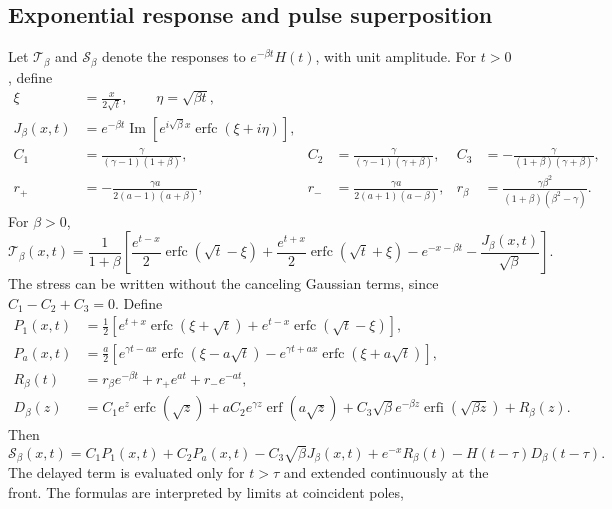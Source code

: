 \documentclass[11pt]{article}
\begin{document}
\subsection{Exponential response and pulse superposition}

Let $\mathcal T_\beta$ and $\mathcal S_\beta$ denote the responses to
$e^{-\beta t}H(t)$, with unit amplitude. For $t>0$, define
\begin{align}
 \xi&=\frac{x}{2\sqrt t},\qquad \eta=\sqrt{\beta t},\\
 J_\beta(x,t)&=e^{-\beta t}
  \operatorname{Im}\left[e^{i\sqrt\beta x}
     \operatorname{erfc}(\xi+i\eta)\right],\\
 C_1&=\frac{\gamma}{(\gamma-1)(1+\beta)},&
 C_2&=\frac{\gamma}{(\gamma-1)(\gamma+\beta)},&
 C_3&=-\frac{\gamma}{(1+\beta)(\gamma+\beta)},\\
 r_+&=-\frac{\gamma a}{2(a-1)(a+\beta)},&
 r_-&=\frac{\gamma a}{2(a+1)(a-\beta)},&
 r_\beta&=\frac{\gamma\beta^2}{(1+\beta)(\beta^2-\gamma)}.
\end{align}
For $\beta>0$,
\begin{equation}
 \mathcal T_\beta(x,t)=\frac{1}{1+\beta}\left[
 \frac{e^{t-x}}{2}\operatorname{erfc}(\sqrt t-\xi)
 +\frac{e^{t+x}}{2}\operatorname{erfc}(\sqrt t+\xi)
 -e^{-x-\beta t}-\frac{J_\beta(x,t)}{\sqrt\beta}\right].
 \label{eq:corrected-T}
\end{equation}
The stress can be written without the canceling Gaussian terms, since
$C_1-C_2+C_3=0$. Define
\begin{align}
 P_1(x,t)&=\frac12\left[
 e^{t+x}\operatorname{erfc}(\xi+\sqrt t)
 +e^{t-x}\operatorname{erfc}(\sqrt t-\xi)\right],\\
 P_a(x,t)&=\frac a2\left[
 e^{\gamma t-a x}\operatorname{erfc}(\xi-a\sqrt t)
 -e^{\gamma t+a x}\operatorname{erfc}(\xi+a\sqrt t)\right],\\
 R_\beta(t)&=r_\beta e^{-\beta t}+r_+e^{at}+r_-e^{-at},\\
 D_\beta(z)&=C_1 e^z\operatorname{erfc}(\sqrt z)
 +aC_2e^{\gamma z}\operatorname{erf}(a\sqrt z)
 +C_3\sqrt\beta e^{-\beta z}\operatorname{erfi}(\sqrt{\beta z})
 +R_\beta(z).
\end{align}
Then
\begin{equation}
 \mathcal S_\beta(x,t)=C_1P_1(x,t)+C_2P_a(x,t)
 -C_3\sqrt\beta J_\beta(x,t)+e^{-x}R_\beta(t)
 -H(t-\tau)D_\beta(t-\tau).
 \label{eq:corrected-stress}
\end{equation}
The delayed term is evaluated only for $t>\tau$ and extended continuously
at the front. The formulas are interpreted by limits at coincident poles,
\end{document}
